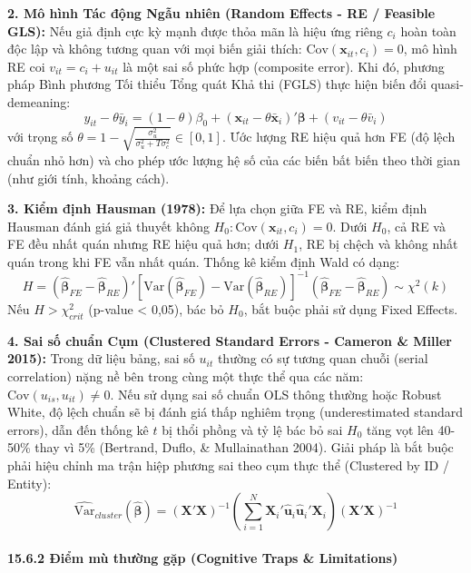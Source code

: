 \documentclass[
]{article}
\begin{document}
\textbf{2. Mô hình Tác động Ngẫu nhiên (Random Effects - RE / Feasible
GLS):} Nếu giả định cực kỳ mạnh được thỏa mãn là hiệu ứng riêng \(c_i\)
hoàn toàn độc lập và không tương quan với mọi biến giải thích:
\(\text{Cov}(\mathbf{x}_{it}, c_i) = 0\), mô hình RE coi
\(v_{it} = c_i + u_{it}\) là một sai số phức hợp (composite error). Khi
đó, phương pháp Bình phương Tối thiểu Tổng quát Khả thi (FGLS) thực hiện
biến đổi quasi-demeaning:
\[y_{it} - \theta \bar{y}_i = (1-\theta)\beta_0 + (\mathbf{x}_{it} - \theta \bar{\mathbf{x}}_i)'\boldsymbol{\beta} + (v_{it} - \theta \bar{v}_i)\]
với trọng số
\(\theta = 1 - \sqrt{\frac{\sigma_u^2}{\sigma_u^2 + T\sigma_c^2}} \in [0, 1]\).
Ước lượng RE hiệu quả hơn FE (độ lệch chuẩn nhỏ hơn) và cho phép ước
lượng hệ số của các biến bất biến theo thời gian (như giới tính, khoảng
cách).

\textbf{3. Kiểm định Hausman (1978):} Để lựa chọn giữa FE và RE, kiểm
định Hausman đánh giá giả thuyết không
\(H_0: \text{Cov}(\mathbf{x}_{it}, c_i) = 0\). Dưới \(H_0\), cả RE và FE
đều nhất quán nhưng RE hiệu quả hơn; dưới \(H_1\), RE bị chệch và không
nhất quán trong khi FE vẫn nhất quán. Thống kê kiểm định Wald có dạng:
\[H = (\hat{\boldsymbol{\beta}}_{FE} - \hat{\boldsymbol{\beta}}_{RE})' [\text{Var}(\hat{\boldsymbol{\beta}}_{FE}) - \text{Var}(\hat{\boldsymbol{\beta}}_{RE})]^{-1} (\hat{\boldsymbol{\beta}}_{FE} - \hat{\boldsymbol{\beta}}_{RE}) \sim \chi^2(k)\]
Nếu \(H > \chi_{crit}^2\) (p-value \textless{} 0,05), bác bỏ \(H_0\),
bắt buộc phải sử dụng Fixed Effects.

\textbf{4. Sai số chuẩn Cụm (Clustered Standard Errors - Cameron \&
Miller 2015):} Trong dữ liệu bảng, sai số \(u_{it}\) thường có sự tương
quan chuỗi (serial correlation) nặng nề bên trong cùng một thực thể qua
các năm: \(\text{Cov}(u_{is}, u_{it}) \neq 0\). Nếu sử dụng sai số chuẩn
OLS thông thường hoặc Robust White, độ lệch chuẩn sẽ bị đánh giá thấp
nghiêm trọng (underestimated standard errors), dẫn đến thống kê \(t\) bị
thổi phồng và tỷ lệ bác bỏ sai \(H_0\) tăng vọt lên 40-50\% thay vì 5\%
(Bertrand, Duflo, \& Mullainathan 2004). Giải pháp là bắt buộc phải hiệu
chỉnh ma trận hiệp phương sai theo cụm thực thể (Clustered by ID /
Entity):
\[\widehat{\text{Var}}_{cluster}(\hat{\boldsymbol{\beta}}) = (\mathbf{X}'\mathbf{X})^{-1} \left( \sum_{i=1}^N \mathbf{X}_i' \hat{\mathbf{u}}_i \hat{\mathbf{u}}_i' \mathbf{X}_i \right) (\mathbf{X}'\mathbf{X})^{-1}\]

\paragraph{15.6.2 Điểm mù thường gặp (Cognitive Traps \&
Limitations)}\label{ux111iux1ec3m-muxf9-thux1b0ux1eddng-gux1eb7p-cognitive-traps-limitations-102}
\end{document}
